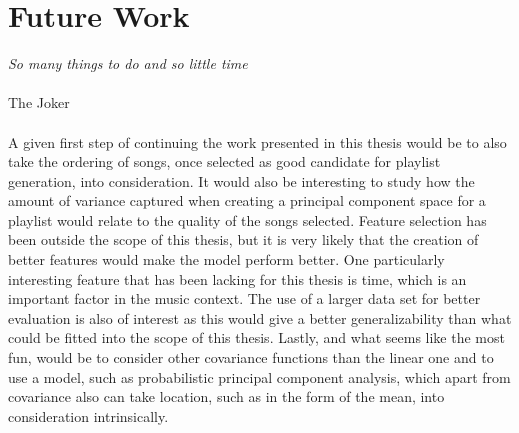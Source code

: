 \documentclass[a4paper,11pt]{kth-mag}
\begin{document}
\section{Future Work}
\textit{So many things to do and so little time} \\\\The Joker\\\\
A given first step of continuing the work presented in this thesis would be to also take the ordering of songs, once selected as good candidate for playlist generation, into consideration. It would also be interesting to study how the amount of variance captured when creating a principal component space for a playlist would relate to the quality of the songs selected. Feature selection has been outside the scope of this thesis, but it is very likely that the creation of better features would make the model perform better. One particularly interesting feature that has been lacking for this thesis is time, which is an important factor in the music context. The use of a larger data set for better evaluation is also of interest as this would give a better generalizability than what could be fitted into the scope of this thesis. Lastly, and what seems like the most fun, would be to consider other covariance functions than the linear one and to use a model, such as probabilistic principal component analysis, which apart from covariance also can take location, such as in the form of the mean, into consideration intrinsically.


\end{document}
